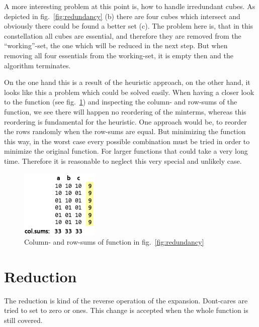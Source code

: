 \documentclass[colorback,accentcolor=tud1c,11pt]{tudreport}
\begin{document}
 A more interesting problem at this point is, how to handle irredundant cubes. As depicted in fig.~\ref{fig:redundancy} (b) there are four cubes which intersect and obviously there could be found a better set (c). The problem here is, that in this constellation all cubes are essential, and therefore they are removed from the ``working''-set, the one which will be reduced in the next step. But when removing all four essentials from the working-set, it is empty then and the algorithm terminates.
 \par
 On the one hand this is a result of the heuristic approach, on the other hand, it looks like this a problem which could be solved easily. When having a closer look to the function (see fig.~\ref{fig:redundancy2}) and inspecting the column- and row-sums of the function, we see there will happen no reordering of the minterms, whereas this reordering is fundamental for the heuristic. One approach would be, to reorder the rows randomly when the row-sums are equal. But minimizing the function this way, in the worst case every possible combination must be tried in order to minimize the original function. For larger functions that could take a very long time. Therefore it is reasonable to neglect this very special and unlikely case.

 \begin{figure}
   \centering
   \includegraphics{redundancy2}
   \caption{Column- and row-sums of function in fig.~\ref{fig:redundancy}}
   \label{fig:redundancy2}
 \end{figure}

 \section{Reduction}
 The reduction is kind of the reverse operation of the expansion. Dont-cares are tried to set to zero or ones. This change is accepted when the whole function is still covered.
\end{document}
